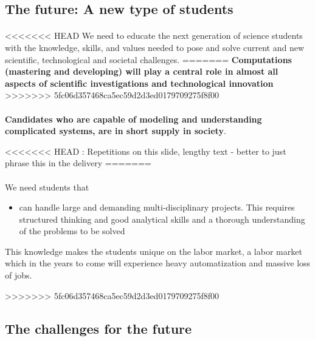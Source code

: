 \documentclass[%
<<<<<<< HEAD
oneside,                 %
final,                   %
=======
twoside,                 %
final,                   %
>>>>>>> 5fc06d357468ca5ec59d2d3ed0179709275f8f00
10pt]{article}
\newcommand{\shortinlinecomment}[3]{{\color{red}{\bf #1}: #2}}
\begin{document}
\begin{itemize}
\subsection*{The future: A new type of students}


\paragraph{}
<<<<<<< HEAD
We need to educate the next generation of
science students with the knowledge, skills, and values needed to pose
and solve current and new scientific, technological and societal
challenges.
=======
\textbf{Computations (mastering and developing)  will play a central role in almost all aspects of scientific investigations and technological innovation}
>>>>>>> 5fc06d357468ca5ec59d2d3ed0179709275f8f00




\paragraph{}
\textbf{Candidates who are capable of modeling and understanding complicated
systems, are in short supply in society}.



<<<<<<< HEAD
\shortinlinecomment{hpl 2}{ Repetitions on this slide, lengthy text - better to just phrase this in the delivery }{ Repetitions on this slide, }
=======
\paragraph{}
We need students that  
\begin{itemize}
\item can handle large and demanding multi-disciplinary  projects. This requires structured thinking and good analytical skills and a thorough understanding of the problems to be solved 
\end{itemize}

\noindent
This knowledge makes the students unique on the labor market, a labor market which in the years to come will experience heavy automatization and massive loss of jobs.


>>>>>>> 5fc06d357468ca5ec59d2d3ed0179709275f8f00




\subsection*{The challenges for the future}


\end{itemize}
\end{document}
